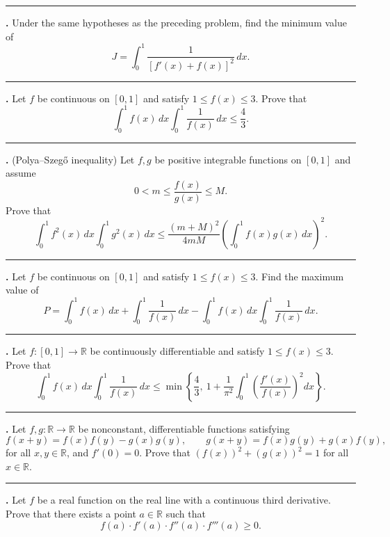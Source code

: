\documentclass[11pt]{article}
\newcounter{probnum}
\newenvironment{problembox}{\par\noindent\rule{\linewidth}{0.5pt}\vspace{5pt}\par}{\vspace{2pt}}
\begin{document}
\begin{problembox}
\textbf{\theprobnum.} Under the same hypotheses as the preceding problem, find the minimum value of
\[
J = \int_0^1 \frac{1}{[f'(x)+f(x)]^2}\,dx.
\]
\end{problembox}

\begin{problembox}
\textbf{\theprobnum.} Let $f$ be continuous on $[0,1]$ and satisfy $1 \le f(x) \le 3$. Prove that
\[
\int_0^1 f(x)\,dx \int_0^1 \frac{1}{f(x)}\,dx \le \frac{4}{3}.
\]
\end{problembox}

\begin{problembox}
\textbf{\theprobnum.} (Polya--Szeg\H{o} inequality) Let $f,g$ be positive integrable functions on $[0,1]$ and assume
\[
0 < m \le \frac{f(x)}{g(x)} \le M.
\]
Prove that
\[
\int_0^1 f^2(x)\,dx \int_0^1 g^2(x)\,dx \le \frac{(m+M)^2}{4mM} \left(\int_0^1 f(x)g(x)\,dx\right)^2.
\]
\end{problembox}

\begin{problembox}
\textbf{\theprobnum.} Let $f$ be continuous on $[0,1]$ and satisfy $1 \le f(x) \le 3$. Find the maximum value of
\[
P = \int_0^1 f(x)\,dx + \int_0^1 \frac{1}{f(x)}\,dx - \int_0^1 f(x)\,dx \int_0^1 \frac{1}{f(x)}\,dx.
\]
\end{problembox}

\begin{problembox}
\textbf{\theprobnum.} Let $f : [0,1] \to \mathbb{R}$ be continuously differentiable and satisfy $1 \le f(x) \le 3$. Prove that
\[
\int_0^1 f(x)\,dx \int_0^1 \frac{1}{f(x)}\,dx \le \min\left\{\frac{4}{3},\ 1 + \frac{1}{\pi^2}\int_0^1 \left(\frac{f'(x)}{f(x)}\right)^2 dx\right\}.
\]
\end{problembox}

\begin{problembox}
\textbf{\theprobnum.} Let $f, g : \mathbb{R} \to \mathbb{R}$ be nonconstant, differentiable functions satisfying
\[
f(x+y) = f(x)f(y) - g(x)g(y), \qquad g(x+y) = f(x)g(y) + g(x)f(y),
\]
for all $x, y \in \mathbb{R}$, and $f'(0) = 0$. Prove that $(f(x))^2 + (g(x))^2 = 1$ for all $x \in \mathbb{R}$.
\end{problembox}

\begin{problembox}
\textbf{\theprobnum.} Let $f$ be a real function on the real line with a continuous third derivative. Prove that there exists a point $a \in \mathbb{R}$ such that
\[
f(a) \cdot f'(a) \cdot f''(a) \cdot f'''(a) \ge 0.
\]
\end{problembox}
\end{document}
